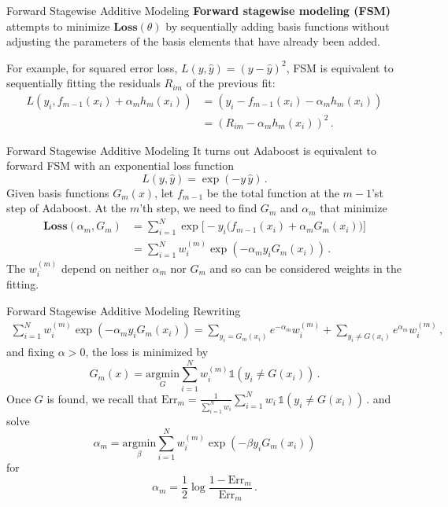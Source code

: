 \documentclass[10pt, table, dvipsnames,xcdraw, handout]{beamer}
\begin{document}
\begin{frame}[fragile]{Forward Stagewise Additive Modeling}
\textbf{Forward stagewise modeling (FSM)} attempts to minimize $\textbf{Loss}(\theta)$ by sequentially adding basis functions without adjusting the parameters of the basis elements that have already been added. \pause 

For example, for squared error loss, $L(y,\hat y) = (y - \hat y)^2$, FSM is equivalent to sequentially fitting the residuals $R_{im}$ of the previous fit:
\begin{align*}
L(y_i,f_{m-1}(x_i) + \alpha_m h_m(x_i) ) &= (y_i - f_{m-1}(x_i) - \alpha_m h_m(x_i) ) 
\\
&= (R_{im} - \alpha_m h_m(x_i) )^2\,.
\end{align*}
\end{frame}



\begin{frame}[fragile]{Forward Stagewise Additive Modeling}
It turns out Adaboost is equivalent to forward FSM with an exponential loss function
$$
L(y,\hat y) = \exp(-y\, \hat y)\,.
$$\pause
Given basis functions $G_m(x)$, let $f_{m-1}$ be the total function at the $m-1$'st step of Adaboost. At the $m$'th step, we need to find $G_m$ and $\alpha_m$ that minimize
\begin{align*}
\textbf{Loss}(\alpha_m,G_m) &= \sum_{i=1}^N\exp\Big[ -y_i \big(f_{m-1}(x_i) + \alpha_m G_m(x_i) \big)\Big] 
\\
&= 
\sum_{i=1}^Nw_i^{(m)}\exp(-\alpha_m y_i G_m(x_i))\,.
\end{align*}\pause
The $w_i^{(m)}$ depend on neither $\alpha_m$ nor $G_m$ and so can be considered weights in the fitting. 
\end{frame}




\begin{frame}[fragile]{Forward Stagewise Additive Modeling}
Rewriting 
\begin{align*}
\sum_{i=1}^Nw_i^{(m)}\exp(-\alpha_m y_i G_m(x_i)) = \sum_{y_i = G_m(x_i)}e^{-\alpha_m}w_i^{(m)} + \sum_{y_i \neq G(x_i)}e^{\alpha_m}w_i^{(m)} \,,
\end{align*}\pause
and fixing $\alpha>0$, the loss is minimized by
$$
G_m(x) = \underset{G}{\text{argmin}} \sum_{i=1}^N w_i^{(m)}\mathds{1}(y_i\neq G(x_i))\,.
$$\pause 
Once $G$ is found, we recall that 
$
\text{Err}_m = \frac{1}{\sum_{i=1}^N w_i} \sum_{i=1}^N w_i\, \mathds{1}(y_i \neq G(x_i))\,.
$
and solve
$$
\alpha_m = \underset{\beta}{\text{argmin}}\sum_{i=1}^Nw_i^{(m)}\exp(-\beta y_i G_m(x_i))
$$
for 
$$
\alpha_m = \frac12\log\frac{1-\text{Err}_m}{\text{Err}_m}\,.
$$
\end{frame}
\end{document}

